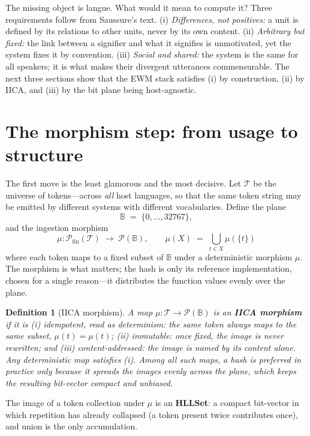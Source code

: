 \documentclass[11pt,a4paper]{article}
\newtheorem{definition}[principle]{Definition}
\theoremstyle{remark}
\newcommand{\Plane}{\ensuremath{\mathbb{B}}}            %
\newcommand{\Tok}{\ensuremath{\mathcal{T}}}              %
\newcommand{\Ing}{\ensuremath{\mu}}                      %
\begin{document}
The missing object is langue. What would it mean to compute it? Three
requirements follow from Saussure's text. (i) \emph{Differences, not positives:}
a unit is defined by its relations to other units, never by its own content.
(ii) \emph{Arbitrary but fixed:} the link between a signifier and what it
signifies is unmotivated, yet the system fixes it by convention.
(iii) \emph{Social and shared:} the system is the same for all speakers; it is
what makes their divergent utterances commensurable. The next three sections
show that the EWM stack satisfies (i) by construction, (ii) by IICA, and
(iii) by the bit plane being host-agnostic.

\section{The morphism step: from usage to structure}
\label{sec:morphism}

The first move is the least glamorous and the most decisive. Let $\Tok$ be the
universe of tokens---across \emph{all} host languages, so that the same token
string may be emitted by different systems with different vocabularies. Define
the plane
\[
  \Plane \;=\; \{0,\dots,32767\},
\]
and the ingestion morphism
\[
  \Ing : \mathcal{P}_{\mathrm{fin}}(\Tok) \;\longrightarrow\; \mathcal{P}(\Plane),
  \qquad
  \Ing(X) \;=\; \bigcup_{t \in X} \Ing(\{t\})
\]
where each token maps to a fixed subset of $\Plane$ under a deterministic
morphism $\Ing$. The morphism is what matters; the hash is only its reference
implementation, chosen for a single reason---it distributes the function values
evenly over the plane.

\begin{definition}[IICA morphism]
A map $\Ing : \Tok \to \mathcal{P}(\Plane)$ is an \textbf{IICA morphism} if it
is
(i) \emph{idempotent}, read as \emph{determinism}: the same token always maps
to the same subset, $\Ing(t) = \Ing(t)$;
(ii) \emph{immutable}: once fixed, the image is never rewritten; and
(iii) \emph{content-addressed}: the image is named by its content alone.
Any deterministic map satisfies (i). Among all such maps, a hash is preferred
in practice only because it spreads the images evenly across the plane, which
keeps the resulting bit-vector compact and unbiased.
\end{definition}

The image of a token collection under $\Ing$ is an \textbf{HLLSet}: a compact
bit-vector in which repetition has already collapsed (a token present twice
contributes once), and union is the only accumulation.
\end{document}
